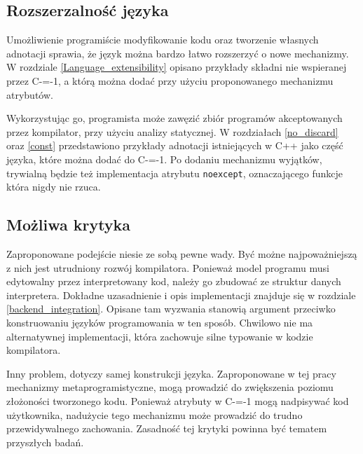 \subsection{Rozszerzalność języka}

Umożliwienie programiście modyfikowanie kodu oraz tworzenie własnych adnotacji sprawia, że język można bardzo łatwo rozszerzyć o nowe mechanizmy.
W rozdziale \ref{Language_extensibility} opisano przykłady składni nie wspieranej przez C-=-1, a którą można dodać przy użyciu proponowanego mechanizmu atrybutów.

Wykorzystując go, programista może zawęzić zbiór programów akceptowanych przez kompilator, przy użyciu analizy statycznej.
W rozdziałach \ref{no_discard} oraz \ref{const} przedstawiono przykłady adnotacji istniejących w C++ jako część języka, które można dodać do C-=-1.
Po dodaniu mechanizmu wyjątków, trywialną będzie też implementacja atrybutu \lstinline{noexcept}, oznaczającego funkcje która nigdy nie rzuca.

\subsection{Możliwa krytyka}

Zaproponowane podejście niesie ze sobą pewne wady.
Być możne najpoważniejszą z nich jest utrudniony rozwój kompilatora.
Ponieważ model programu musi edytowalny przez interpretowany kod, należy go zbudować ze struktur danych interpretera.
Dokładne uzasadnienie i opis implementacji znajduje się w rozdziale \ref{backend_integration}.
Opisane tam wyzwania stanowią argument przeciwko konstruowaniu języków programowania w ten sposób. 
Chwilowo nie ma alternatywnej implementacji, która zachowuje silne typowanie w kodzie kompilatora.

Inny problem, dotyczy samej konstrukcji języka.
Zaproponowane w tej pracy mechanizmy metaprogramistyczne, mogą prowadzić do zwiększenia poziomu złożoności tworzonego kodu.
Ponieważ atrybuty w C-=-1 mogą nadpisywać kod użytkownika, nadużycie tego mechanizmu może prowadzić do trudno przewidywalnego zachowania.
Zasadność tej krytyki powinna być tematem przyszłych badań.

